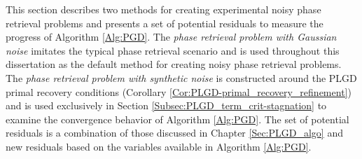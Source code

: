 This section describes two methods for creating experimental noisy phase retrieval problems and presents a set of potential residuals to measure the progress of Algorithm \ref{Alg:PGD}.
The \textit{phase retrieval problem with Gaussian noise} imitates the typical phase retrieval scenario and is used throughout this dissertation as the default method for creating noisy phase retrieval problems.
The \textit{phase retrieval problem with synthetic noise} is constructed around the PLGD primal recovery conditions (Corollary \ref{Cor:PLGD-primal_recovery_refinement}) and is used exclusively in Section \ref{Subsec:PLGD_term_crit-stagnation} to examine the convergence behavior of Algorithm \ref{Alg:PGD}.
The set of potential residuals is a combination of those discussed in Chapter \ref{Sec:PLGD_algo} and new residuals based on the variables available in Algorithm \ref{Alg:PGD}. 











